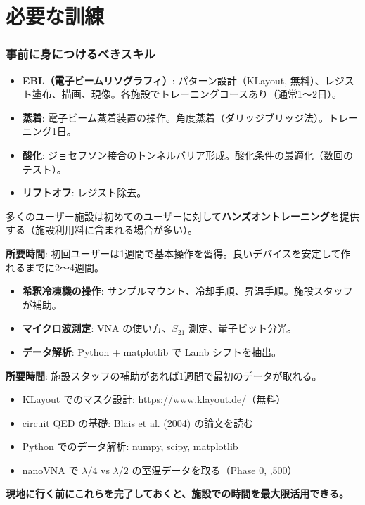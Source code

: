 \documentclass[12pt,a4paper]{article}
\begin{document}
\part{必要な訓練}

\section{事前に身につけるべきスキル}

\begin{stepbox}
\begin{itemize}
\item \textbf{EBL（電子ビームリソグラフィ）}: パターン設計（KLayout, 無料）、レジスト塗布、描画、現像。各施設でトレーニングコースあり（通常1〜2日）。
\item \textbf{蒸着}: 電子ビーム蒸着装置の操作。角度蒸着（ダリッジブリッジ法）。トレーニング1日。
\item \textbf{酸化}: ジョセフソン接合のトンネルバリア形成。酸化条件の最適化（数回のテスト）。
\item \textbf{リフトオフ}: レジスト除去。
\end{itemize}

多くのユーザー施設は初めてのユーザーに対して\textbf{ハンズオントレーニング}を提供する（施設利用料に含まれる場合が多い）。

\textbf{所要時間}: 初回ユーザーは1週間で基本操作を習得。良いデバイスを安定して作れるまでに2〜4週間。
\end{stepbox}

\begin{stepbox}[低温測定訓練]
\begin{itemize}
\item \textbf{希釈冷凍機の操作}: サンプルマウント、冷却手順、昇温手順。施設スタッフが補助。
\item \textbf{マイクロ波測定}: VNA の使い方、$S_{21}$ 測定、量子ビット分光。
\item \textbf{データ解析}: Python + matplotlib で Lamb シフトを抽出。
\end{itemize}

\textbf{所要時間}: 施設スタッフの補助があれば1週間で最初のデータが取れる。
\end{stepbox}

\begin{honestbox}[事前にオンラインで学べること]
\begin{itemize}
\item KLayout でのマスク設計: \url{https://www.klayout.de/}（無料）
\item circuit QED の基礎: Blais et al. (2004) の論文を読む
\item Python でのデータ解析: numpy, scipy, matplotlib
\item nanoVNA で $\lambda/4$ vs $\lambda/2$ の室温データを取る（Phase 0, ,500）
\end{itemize}

\textbf{現地に行く前にこれらを完了しておくと、施設での時間を最大限活用できる。}
\end{honestbox}
\end{document}
